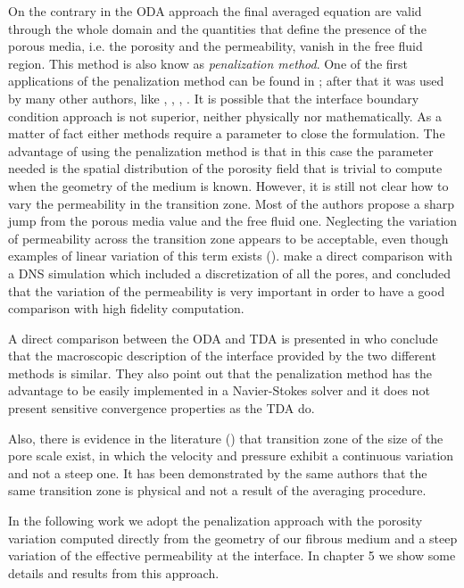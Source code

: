 On the contrary in the ODA approach the final averaged equation are valid through the whole domain and the quantities that define the presence of the porous media, i.e. the porosity and the permeability, vanish in the free fluid region.
This method is also know as \textit{penalization method}. One of the first applications of the penalization method can be found in \citet{caltagirone1994interaction}; after that it was used by many other authors, like \citet{bruneau2004passive}, \citet{bruneau2008numerical}, \citet{bruneau2010coupling}, \citet{hussong2011continuum}.
It is possible that the interface boundary condition approach is not superior, neither physically nor mathematically.
As a matter of fact either methods require a parameter to close the formulation. The advantage of using the penalization method is that in this case the parameter needed is the spatial distribution of the porosity field that is trivial to compute when the geometry of the medium is known.
However, it is still not clear how to vary the permeability in the transition zone. Most of the authors propose a sharp jump from the porous media value and the free fluid one. Neglecting the variation of permeability across the transition zone appears to be acceptable, even though examples of linear variation of this term exists (\citet{caltagirone1994interaction}).
\citet{hussong2011continuum} make a direct comparison with a DNS simulation which included a discretization of all the pores, and concluded that the variation of the permeability is very important in order to have a good comparison with high fidelity computation.

A direct comparison between the ODA and TDA is presented in \citet{cimolin2013navier} who conclude that the macroscopic description of the interface provided by the two different methods is similar. They also point out that the penalization method has the advantage to be easily implemented in a Navier-Stokes solver and it does not present sensitive convergence properties as the TDA do.

Also, there is evidence in the literature (\citet{ochoa2017fluid}) that transition zone of the size of the pore scale exist, in which the velocity and pressure exhibit a continuous variation and not a steep one. It has been demonstrated by the same authors that the same transition zone is physical and not a result of the averaging procedure.

In the following work we adopt the penalization approach with the porosity variation computed directly from the geometry of our fibrous medium and a steep variation of the effective permeability at the interface. In chapter 5 we show some details and results from this approach.


